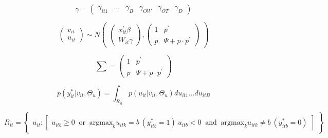 \documentclass[11pt]{jsarticle}
\begin{document}
\begin{equation} \label{formulad2_8}
  \gamma =
  \begin{pmatrix}
      \gamma_{it1} & \ldots & \gamma_{B} & \gamma_{OW} & \gamma_{OT} & \gamma_{D}
   \end{pmatrix}
\end{equation}

\begin{equation} \label{formulad2_9}
  \begin{pmatrix}
      v_{it} \\
      u_{it} 
   \end{pmatrix}
   \sim N
  \begin{pmatrix}
	  \begin{pmatrix}
	  x^{\prime}_{it}\beta\\
	  W_{it}\gamma
	  \end{pmatrix}
	  ,
	  \begin{pmatrix}
	  1 & p^\prime\\
	  p & \Psi + p \cdot p^\prime
	  \end{pmatrix}
  \end{pmatrix}
\end{equation}

\begin{equation} \label{formulad2_10}
\sum = 
\begin{pmatrix}
1 & p^\prime\\
p & \Psi + p \cdot p^\prime
\end{pmatrix}
\end{equation}

\begin{equation} \label{formulad2_11}
p(y^\ast_{it} | v_{it}, \Theta_{u}) = \int_{R_{it}} p(u_{it} | v_{it}, \Theta_{u}) du_{it1} \ldots du_{itB}
\end{equation}

\begin{equation} \label{formulad2_12}
R_{it} = 
\begin{Bmatrix}
u_{it} : 
\begin{bmatrix}
u_{itb} \geq 0 \;\; \mbox{or} \;\; \mbox{argmax}_{k}u_{itk} = b \
(y^\ast_{itb} = 1) \
u_{itb} < 0 \;\; \mbox{and} \;\; \mbox{argmax}_{k}u_{itk} \neq b \
(y^\ast_{itb} = 0)
\end{bmatrix}
\end{Bmatrix}
\end{equation}
\end{document}

